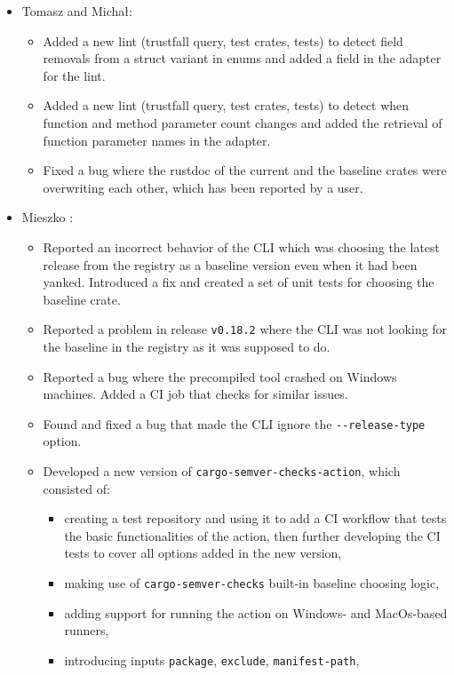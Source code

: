 \documentclass[licencjacka,en]{pracamgr}
\begin{document}
\begin{itemize}
	\item Tomasz and Michał:
		\begin{itemize}
			\item Added a new lint (trustfall query, test crates, tests) to detect field removals
				from a struct variant in enums and added a field in the adapter for the lint.
			\item Added a new lint (trustfall query, test crates, tests) to detect when function
				and method parameter count changes and added the retrieval of function parameter
				names in the adapter.
			\item Fixed a bug where the rustdoc of the current and the baseline crates
				were overwriting each other, which has been reported by a user.
		\end{itemize}

	\item Mieszko \cite{responsibilities-mieszko}:
		\begin{itemize}
			\item Reported an incorrect behavior of the CLI which was choosing the latest release
				from the registry as a baseline version even when it had been yanked.
				Introduced a fix and created a set of unit tests for choosing the baseline crate.
			\item Reported a problem in release \texttt{v0.18.2} where the CLI was not looking for
				the baseline in the registry as it was supposed to do.
			\item Reported a bug where the precompiled tool crashed on Windows machines.
				Added a CI job that checks for similar issues.
			\item Found and fixed a bug that made the CLI ignore the \texttt{-{}-release-type} option.
			\item Developed a new version of \texttt{cargo-semver-checks-action}, which consisted of:
			\begin{itemize}
				\item creating a test repository \cite{responsibilities-mieszko-action-tests}
					and using it to add a CI workflow that tests the basic functionalities of
					the action, then further developing the CI tests to cover all options added in
					the new version,
				\item making use of \texttt{cargo-semver-checks} built-in baseline choosing logic,
				\item adding support for running the action on Windows- and MacOs-based runners,
				\item introducing inputs \texttt{package}, \texttt{exclude}, \texttt{manifest-path},

\end{itemize}
\end{itemize}
\end{itemize}
\end{document}
